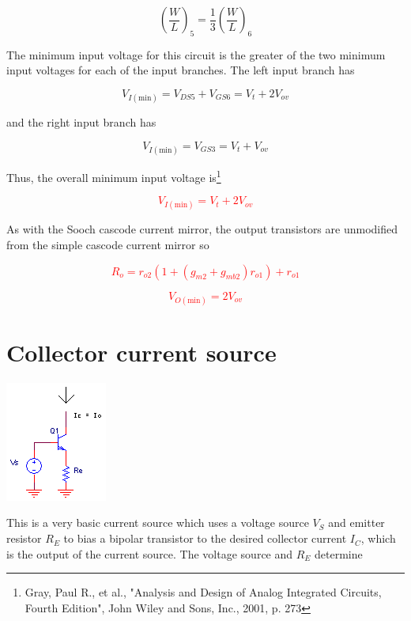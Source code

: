 \begin{equation}
\left(\frac{W}{L}\right)_{5} = \frac{1}{3}\left(\frac{W}{L}\right)_{6}
\end{equation}

\par The minimum input voltage for this circuit is the greater of the two minimum input voltages for each of the input branches. The left input branch has

\begin{equation}
V_{I(\text{min})} = V_{DS5} + V_{GS6} = V_{t} + 2V_{ov}
\end{equation}

and the right input branch has

\begin{equation}
V_{I(\text{min})} = V_{GS3} = V_{t} + V_{ov}
\end{equation}

Thus, the overall minimum input voltage is\footnote{Gray, Paul R., et al., "Analysis and Design of Analog Integrated Circuits, Fourth Edition", John Wiley and Sons, Inc., 2001, p. 273}

\textcolor{red}{
\begin{equation}
V_{I(\text{min})} = V_{t} + 2V_{ov}
\end{equation}
}

\par As with the Sooch cascode current mirror, the output transistors are unmodified from the simple cascode current mirror so

\textcolor{red}{
\begin{equation}
R_{o} = r_{o2}(1 + (g_{m2} + g_{mb2})r_{o1}) + r_{o1}
\end{equation}
}

\textcolor{red}{
\begin{equation}
V_{O(\text{min})} = 2V_{ov}
\end{equation}
}

\section{Collector current source}
\begin{center}
	\includegraphics{schematics/collectorcurrentsource.PNG}
\end{center}
This is a very basic current source which uses a voltage source $V_{S}$ and emitter resistor $R_{E}$ to bias a bipolar transistor to the desired collector current $I_{C}$, which is the output of the current source. The voltage source and $R_{E}$ determine

